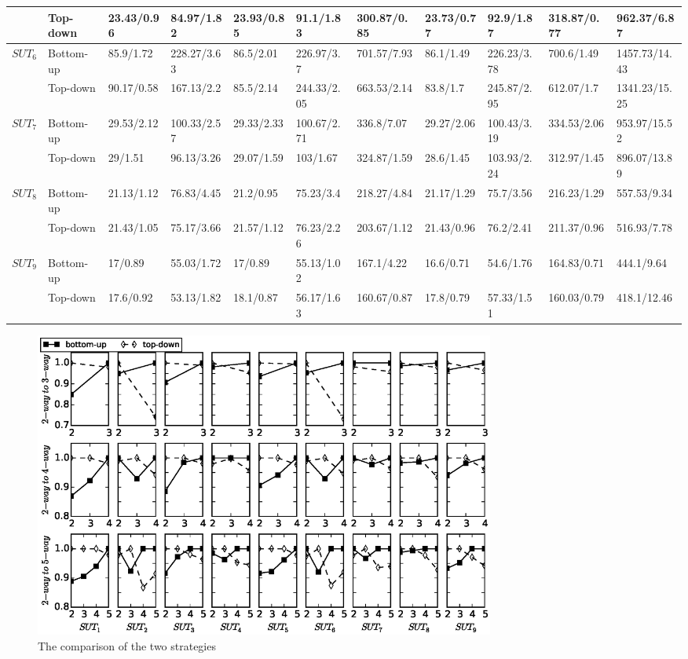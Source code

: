 \documentclass[conference]{IEEEtran}
\theoremstyle{definition}
\begin{document}
\begin{table}[htbp]
\begin{tabular}{|l|l|ll|lll|llll|}
                      & Top-down  & 23.43/0.96       & 84.97/1.82       & 23.93/0.85 & 91.1/1.83   & 300.87/0.85 & 23.73/0.77 & 92.9/1.87   & 318.87/0.77 & 962.37/6.87   \\ \hline
\multirow{2}{*}{$SUT_{6}$} & Bottom-up & 85.9/1.72        & 228.27/3.63      & 86.5/2.01  & 226.97/3.7  & 701.57/7.93 & 86.1/1.49  & 226.23/3.78 & 700.6/1.49  & 1457.73/14.43 \\
                      & Top-down  & 90.17/0.58       & 167.13/2.2       & 85.5/2.14  & 244.33/2.05 & 663.53/2.14 & 83.8/1.7   & 245.87/2.95 & 612.07/1.7  & 1341.23/15.25 \\ \hline
\multirow{2}{*}{$SUT_{7}$} & Bottom-up & 29.53/2.12       & 100.33/2.57      & 29.33/2.33 & 100.67/2.71 & 336.8/7.07  & 29.27/2.06 & 100.43/3.19 & 334.53/2.06 & 953.97/15.52  \\
                      & Top-down  & 29/1.51          & 96.13/3.26       & 29.07/1.59 & 103/1.67    & 324.87/1.59 & 28.6/1.45  & 103.93/2.24 & 312.97/1.45 & 896.07/13.89  \\ \hline
\multirow{2}{*}{$SUT_{8}$} & Bottom-up & 21.13/1.12       & 76.83/4.45       & 21.2/0.95  & 75.23/3.4   & 218.27/4.84 & 21.17/1.29 & 75.7/3.56   & 216.23/1.29 & 557.53/9.34   \\
                      & Top-down  & 21.43/1.05       & 75.17/3.66       & 21.57/1.12 & 76.23/2.26  & 203.67/1.12 & 21.43/0.96 & 76.2/2.41   & 211.37/0.96 & 516.93/7.78   \\ \hline
\multirow{2}{*}{$SUT_{9}$} & Bottom-up & 17/0.89          & 55.03/1.72       & 17/0.89    & 55.13/1.02  & 167.1/4.22  & 16.6/0.71  & 54.6/1.76   & 164.83/0.71 & 444.1/9.64    \\
                      & Top-down  & 17.6/0.92        & 53.13/1.82       & 18.1/0.87  & 56.17/1.63  & 160.67/0.87 & 17.8/0.79  & 57.33/1.51  & 160.03/0.79 & 418.1/12.46   \\ \hline
\end{tabular}
\end{table}

\begin{figure}[htbp]
\center
 \includegraphics[width=6.0in]{experiment.eps}
\caption{The comparison of the two strategies}
\label{experiement}
\end{figure}
\end{document}
